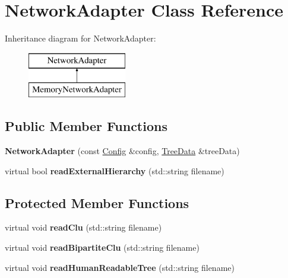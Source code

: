 \hypertarget{classNetworkAdapter}{}\section{Network\+Adapter Class Reference}
\label{classNetworkAdapter}
Inheritance diagram for Network\+Adapter\+:\begin{figure}[H]
\begin{center}
\leavevmode
\includegraphics[height=2.000000cm]{classNetworkAdapter}
\end{center}
\end{figure}
\subsection*{Public Member Functions}
\begin{DoxyCompactItemize}
\item 
\mbox{\label{classNetworkAdapter_a7697affc221226fb7ed3d123324d2abc}} 
{\bfseries Network\+Adapter} (const \mbox{\hyperlink{structConfig}{Config}} \&config, \mbox{\hyperlink{classTreeData}{Tree\+Data}} \&tree\+Data)
\item 
\mbox{\label{classNetworkAdapter_a3bd042b5945d555d190026f4e72bc53a}} 
virtual bool {\bfseries read\+External\+Hierarchy} (std\+::string filename)
\end{DoxyCompactItemize}
\subsection*{Protected Member Functions}
\begin{DoxyCompactItemize}
\item 
\mbox{\label{classNetworkAdapter_a76d7f55811242a89151a75711fe48869}} 
virtual void {\bfseries read\+Clu} (std\+::string filename)
\item 
\mbox{\label{classNetworkAdapter_a3725499741239e369efcc80e3bfd3cc6}} 
virtual void {\bfseries read\+Bipartite\+Clu} (std\+::string filename)
\item 
\mbox{\label{classNetworkAdapter_a0abd2664590c8a8b815d8717bb446250}} 
virtual void {\bfseries read\+Human\+Readable\+Tree} (std\+::string filename)
\end{DoxyCompactItemize}
